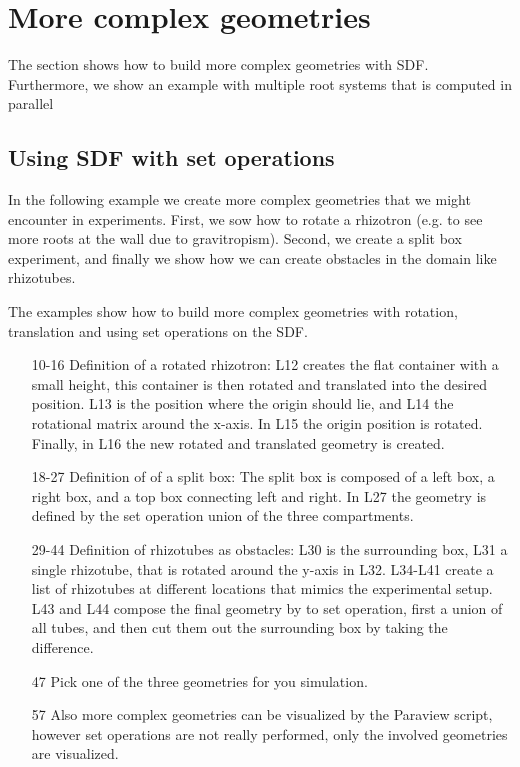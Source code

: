 \documentclass[a4paper]{article}
\begin{document}
\section{More complex geometries}

The section shows how to build more complex geometries with SDF. 
Furthermore, we show an example with multiple root systems that is computed in parallel

\subsection{Using SDF with set operations}

In the following example we create more complex geometries that we might encounter in experiments. 
First, we sow how to rotate a rhizotron (e.g. to see more roots at the wall due to gravitropism). 
Second, we create a split box experiment, and finally we show how we can create obstacles in the domain like rhizotubes. 

The examples show how to build more complex geometries with rotation, translation and using set operations on the SDF.



\begin{itemize}

\item[10-16] Definition of a rotated rhizotron: L12 creates the flat container with a small height, this container is then rotated and translated into the desired position. L13 is the position where the origin should lie, and L14 the rotational matrix around the x-axis. 
In L15 the origin position is rotated. Finally, in L16 the new rotated and translated geometry is created. 
 
\item[18-27] Definition of of a split box: The split box is composed of a left box, a right box, and a top box connecting left and right. In L27 the geometry is defined by the set operation union of the three compartments. 
 
\item[29-44] Definition of rhizotubes as obstacles: L30 is the surrounding box, L31 a single rhizotube, that is rotated around the y-axis in L32. L34-L41 create a list of rhizotubes at different locations that mimics the experimental setup. 
L43 and L44 compose the final geometry by to set operation, first a union of all tubes, and then cut them out the surrounding box by taking the difference. 
 
\item[47] Pick one of the three geometries for you simulation.
 
\item[57] Also more complex geometries can be visualized by the Paraview script, however set operations are not really performed, only the involved geometries are visualized.

\end{itemize}
\end{document}
